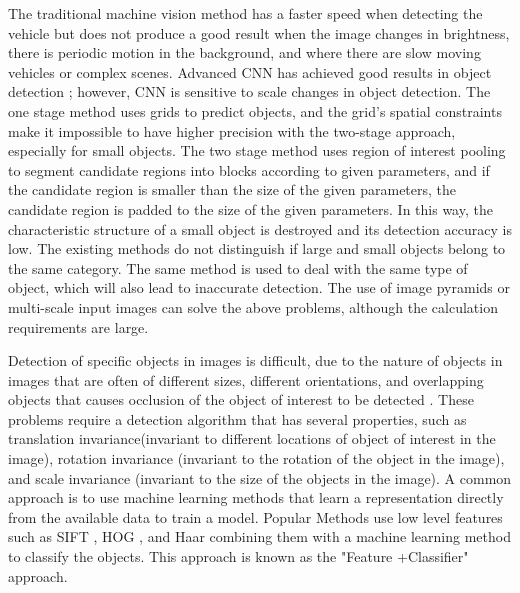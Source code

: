\begin{sloppypar}
The traditional machine vision method has a faster speed when detecting the vehicle but does not produce a good result when the image changes in brightness, there is periodic motion in the background, and where there are slow moving vehicles or complex scenes. Advanced CNN has achieved good results in object detection \cite{cai2016unified, hu2018sinet}; however, CNN is sensitive to scale changes in object detection. The one stage method uses grids to predict objects, and the grid’s spatial constraints make it impossible to have higher precision with the two-stage approach, especially for small objects. The two stage method uses region of interest pooling to segment candidate regions into blocks according to given parameters, and if the candidate region is smaller than the size of the given parameters, the candidate region is padded to the size of the given parameters. In this way, the characteristic structure of a small object is destroyed and its detection accuracy is low. The existing methods do not distinguish if large and small objects belong to the same category. The same method is used to deal with the same type of object, which will also lead to inaccurate detection. The use of image pyramids or multi-scale input images can solve the above problems, although the calculation requirements are large.


Detection of specific objects in images is difficult, due to the nature of objects in images that are often of different sizes, different orientations, and overlapping objects that causes occlusion of the object of interest to be detected \cite{ARINALDI201859}. These problems require a detection algorithm that has several properties, such as translation invariance(invariant to different locations of object of interest in the image), rotation invariance (invariant to the rotation of the object in the image), and scale invariance (invariant to the size of the objects in the image). A common approach is to use machine learning methods that learn a representation directly from the available data to train a model. Popular Methods use low level features such as SIFT \cite{lowe2004distinctive}, HOG \cite{dalal2005histograms}, and Haar \cite{viola2001rapid} combining them with a machine learning method to classify the objects. This approach is known as the "Feature +Classifier" approach.

\end{sloppypar}


